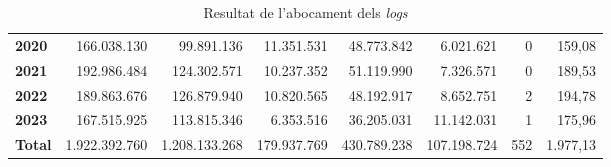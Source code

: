 \begin{table}[h!]
\begin{adjustbox}{width=1.5\textwidth, center}
\begin{tabular}{|l|r|r|r|r|r|r|r|}
        \textbf{2020}       & 166.038.130           & 99.891.136            & 11.351.531                & 48.773.842            & 6.021.621                 & 0             & 159,08        \\
        \textbf{2021}       & 192.986.484           & 124.302.571           & 10.237.352                & 51.119.990            & 7.326.571                 & 0             & 189,53        \\
        \textbf{2022}       & 189.863.676           & 126.879.940           & 10.820.565                & 48.192.917            & 8.652.751                 & 2             & 194,78        \\
        \textbf{2023}       & 167.515.925           & 113.815.346           & 6.353.516                 & 36.205.031            & 11.142.031                & 1             & 175,96        \\
        \midrule
        \textbf{Total}      & 1.922.392.760         & 1.208.133.268         & 179.937.769               & 430.789.238           & 107.198.724               & 552           & 1.977,13      \\
        \bottomrule
    \end{tabular}
    \end{adjustbox}
    \caption{Resultat de l'abocament dels \textit{logs}}
    \label{tab:logs-table}
\end{table}

\clearpage


\clearpage


\clearpage


\clearpage
